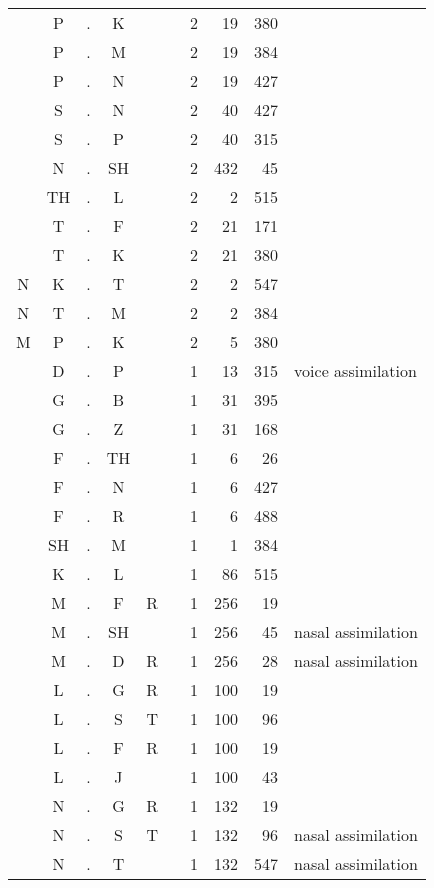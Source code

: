\begin{center}
\begin{longtable}{c@{ } c@{ } c@{ } c@{ } c@{ } c@{ } r r r l }
  & P  & . & K  &   &   & 2 & 19 & 380 &  \\ 
  & P  & . & M  &   &   & 2 & 19 & 384 &  \\ 
  & P  & . & N  &   &   & 2 & 19 & 427 &  \\ 
  & S  & . & N  &   &   & 2 & 40 & 427 &  \\ 
  & S  & . & P  &   &   & 2 & 40 & 315 &  \\ 
  & N  & . & SH &   &   & 2 & 432 & 45 &  \\ 
  & TH & . & L  &   &   & 2 & 2 & 515 &  \\ 
  & T  & . & F  &   &   & 2 & 21 & 171 &  \\ 
  & T  & . & K  &   &   & 2 & 21 & 380 &  \\ 
N & K  & . & T  &   &   & 2 & 2 & 547 &  \\ 
N & T  & . & M  &   &   & 2 & 2 & 384 &  \\ 
M & P  & . & K  &   &   & 2 & 5 & 380 &  \\ 
  & D  & . & P  &   &   & 1 & 13 & 315 & voice assimilation \\
  & G  & . & B  &   &   & 1 & 31 & 395 &  \\ 
  & G  & . & Z  &   &   & 1 & 31 & 168 &  \\ 
  & F  & . & TH &   &   & 1 & 6 & 26 &  \\ 
  & F  & . & N  &   &   & 1 & 6 & 427 &  \\ 
  & F  & . & R  &   &   & 1 & 6 & 488 &  \\ 
  & SH & . & M  &   &   & 1 & 1 & 384 &  \\ 
  & K  & . & L  &   &   & 1 & 86 & 515 &  \\ 
  & M  & . & F  & R &   & 1 & 256 & 19 &  \\ 
  & M  & . & SH &   &   & 1 & 256 & 45 &  nasal assimilation \\
  & M  & . & D  & R &   & 1 & 256 & 28 & nasal assimilation \\
  & L  & . & G  & R &   & 1 & 100 & 19 &  \\ 
  & L  & . & S  & T &   & 1 & 100 & 96 &  \\ 
  & L  & . & F  & R &   & 1 & 100 & 19 &  \\ 
  & L  & . & J  &   &   & 1 & 100 & 43 &  \\ 
  & N  & . & G  & R &   & 1 & 132 & 19 &  \\ 
  & N  & . & S  & T &   & 1 & 132 & 96 & nasal assimilation \\
  & N  & . & T  &   &   & 1 & 132 & 547 & nasal assimilation \\

\end{longtable}
\end{center}
